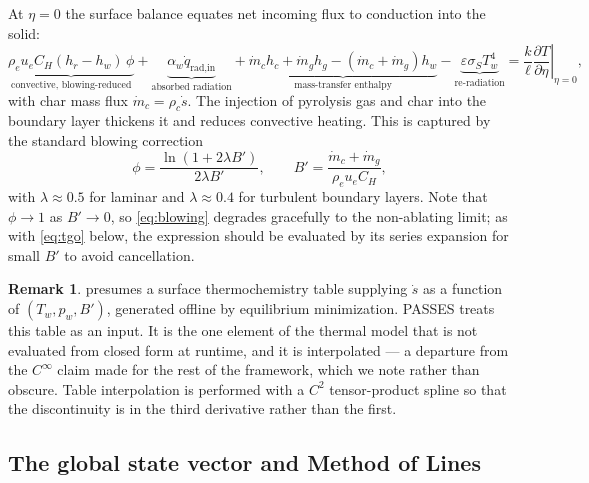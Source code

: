 \documentclass[11pt,a4paper]{article}
\theoremstyle{definition}
\newtheorem{remark}[theorem]{Remark}
\numberwithin{equation}{section}
\begin{document}
At $\eta = 0$ the surface balance equates net incoming flux to conduction into the solid:
\begin{equation}
\label{eq:sebalance}
\underbrace{\rho_e u_e C_H (h_r - h_w)\,\phi}_{\text{convective, blowing-reduced}}
+ \underbrace{\alpha_w \dot{q}_{\text{rad,in}}}_{\text{absorbed radiation}}
+ \underbrace{\dot{m}_c h_c + \dot{m}_g h_g - (\dot{m}_c + \dot{m}_g) h_w}_{\text{mass-transfer enthalpy}}
- \underbrace{\varepsilon \sigma_{\!S} T_w^4}_{\text{re-radiation}}
= \left. \frac{k}{\ell} \frac{\partial T}{\partial \eta} \right|_{\eta = 0},
\end{equation}
with char mass flux $\dot{m}_c = \rho_c \dot{s}$. The injection of pyrolysis gas and char into the boundary layer thickens it and reduces convective heating. This is captured by the standard blowing correction
\begin{equation}
\label{eq:blowing}
\phi = \frac{\ln(1 + 2\lambda B')}{2\lambda B'},
\qquad
B' = \frac{\dot{m}_c + \dot{m}_g}{\rho_e u_e C_H},
\end{equation}
with $\lambda \approx 0.5$ for laminar and $\lambda \approx 0.4$ for turbulent boundary layers. Note that $\phi \to 1$ as $B' \to 0$, so \cref{eq:blowing} degrades gracefully to the non-ablating limit; as with \cref{eq:tgo} below, the expression should be evaluated by its series expansion for small $B'$ to avoid cancellation.

\begin{remark}
 presumes a surface thermochemistry table supplying $\dot{s}$ as a function of $(T_w, p_w, B')$, generated offline by equilibrium minimization. PASSES treats this table as an input. It is the one element of the thermal model that is not evaluated from closed form at runtime, and it is interpolated --- a departure from the $C^\infty$ claim made for the rest of the framework, which we note rather than obscure. Table interpolation is performed with a $C^2$ tensor-product spline so that the discontinuity is in the third derivative rather than the first.
\end{remark}

\subsection{The global state vector and Method of Lines}
\label{sec:mol}
\end{document}
